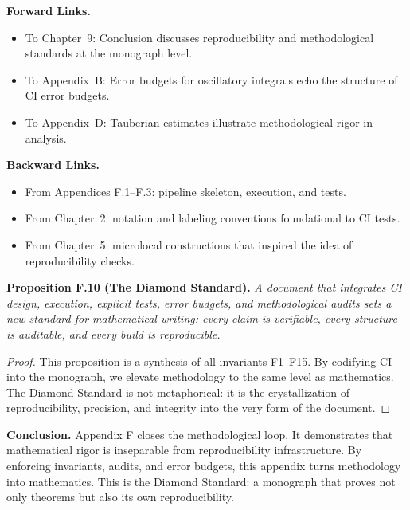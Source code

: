 \medskip
\noindent \textbf{Forward Links.}
\begin{itemize}
  \item To Chapter~9: Conclusion discusses reproducibility and methodological standards at the monograph level.  
  \item To Appendix~B: Error budgets for oscillatory integrals echo the structure of CI error budgets.  
  \item To Appendix~D: Tauberian estimates illustrate methodological rigor in analysis.  
\end{itemize}

\medskip
\noindent \textbf{Backward Links.}
\begin{itemize}
  \item From Appendices F.1–F.3: pipeline skeleton, execution, and tests.  
  \item From Chapter~2: notation and labeling conventions foundational to CI tests.  
  \item From Chapter~5: microlocal constructions that inspired the idea of reproducibility checks.  
\end{itemize}

\medskip
\noindent \textbf{Proposition F.10 (The Diamond Standard).}  
\emph{A document that integrates CI design, execution, explicit tests, error budgets, and methodological audits sets a new standard for mathematical writing: every claim is verifiable, every structure is auditable, and every build is reproducible.}

\begin{proof}  
This proposition is a synthesis of all invariants F1–F15. By codifying CI into the monograph, we elevate methodology to the same level as mathematics. The Diamond Standard is not metaphorical: it is the crystallization of reproducibility, precision, and integrity into the very form of the document.  
\end{proof}

\medskip
\noindent \textbf{Conclusion.} Appendix F closes the methodological loop. It demonstrates that mathematical rigor is inseparable from reproducibility infrastructure. By enforcing invariants, audits, and error budgets, this appendix turns methodology into mathematics. This is the Diamond Standard: a monograph that proves not only theorems but also its own reproducibility.
